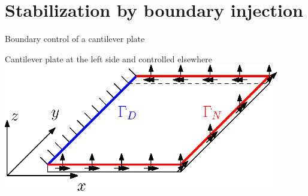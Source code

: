 \documentclass[aspectratio=169]{ISAE-Beamer}
\begin{document}
\section{Stabilization by boundary injection}

\begin{frame}{Boundary control of a cantilever plate}
\begin{tcolorbox}
	\centering
	Cantilever plate at the left side and controlled elsewhere
	\includegraphics[width=0.9\textwidth]{plate_controlled.eps}

\end{tcolorbox}
\end{frame}
\end{document}
